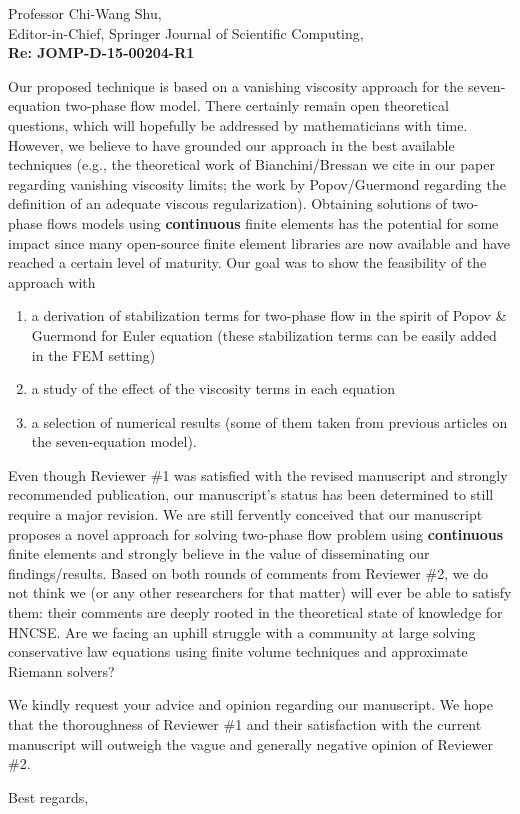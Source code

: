 \documentclass[11pt]{letter}
\begin{document}
\begin{letter}{Professor Chi-Wang Shu, \\  Editor-in-Chief, Springer Journal of Scientific Computing,\\
\textbf{Re: JOMP-D-15-00204-R1}}
\begin{itemize}
\begin{enumerate}
\end{enumerate} 
\end{itemize}
%
Our proposed technique 
is based on a vanishing viscosity approach for the seven-equation two-phase flow model. 
There certainly remain open theoretical questions, which will hopefully be addressed by mathematicians with time. However, we believe to have grounded our approach in the best available techniques (e.g., the theoretical 
work of Bianchini/Bressan we cite in our paper regarding vanishing viscosity limits; the work by Popov/Guermond
regarding the definition of an adequate viscous regularization). Obtaining solutions of two-phase flows models using {\bf continuous } finite elements has the potential for some impact since many open-source finite element libraries
are now available and have reached a certain level of maturity. Our goal was to show the feasibility of the approach with 
\begin{enumerate}
\item
a derivation of stabilization terms for two-phase flow in the spirit of Popov \& Guermond for Euler equation (these stabilization terms can be easily added in the FEM setting)
\item
a study of the effect of the viscosity terms in each equation
\item 
a selection of numerical results (some of them taken from previous articles on the seven-equation model).
\end{enumerate}
 

\bigskip
Even though Reviewer \#1 was
satisfied with the revised manuscript and strongly recommended publication, our manuscript's status has been 
determined to still require a major revision. We are still fervently
conceived that our manuscript proposes a novel approach for solving two-phase flow problem using {\bf continuous}
finite elements and strongly believe in the value of disseminating our findings/results. 
Based on both rounds of comments from Reviewer \#2, we do not think we (or any other researchers for that matter) 
will ever be able to satisfy them: their comments are deeply rooted in the theoretical state of knowledge for HNCSE. 
Are we facing an uphill struggle with a community at large solving conservative law equations using finite volume 
techniques and approximate Riemann solvers? 

We kindly request your advice and opinion regarding our manuscript. We hope that the thoroughness of Reviewer \#1 and their
satisfaction with the current manuscript will outweigh the vague and generally negative opinion of Reviewer \#2.



\closing{Best regards, }

\end{letter}
\end{document}
